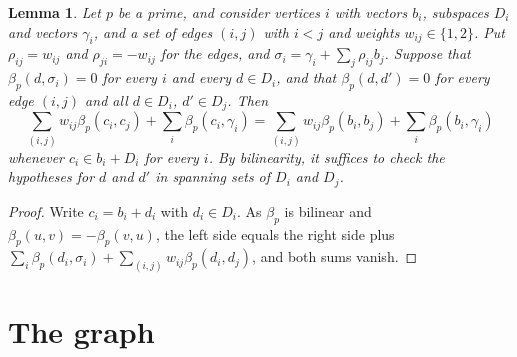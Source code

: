\documentclass[11pt]{article}
\newtheorem{lemma}[theorem]{Lemma}
\begin{document}
\begin{lemma}\label{lem:envelope}
Let $p$ be a prime, and consider vertices $i$ with vectors $b_i$, subspaces $D_i$ and vectors $\gamma_i$, and a set of edges $(i,j)$ with $i<j$ and weights $w_{ij}\in\{1,2\}$. Put $\rho_{ij}=w_{ij}$ and $\rho_{ji}=-w_{ij}$ for the edges, and $\sigma_i=\gamma_i+\sum_j\rho_{ij}b_j$. Suppose that $\beta_p(d,\sigma_i)=0$ for every $i$ and every $d\in D_i$, and that $\beta_p(d,d')=0$ for every edge $(i,j)$ and all $d\in D_i$, $d'\in D_j$. Then
\[
\sum_{(i,j)}w_{ij}\beta_p(c_i,c_j)+\sum_i\beta_p(c_i,\gamma_i)=\sum_{(i,j)}w_{ij}\beta_p(b_i,b_j)+\sum_i\beta_p(b_i,\gamma_i)
\]
whenever $c_i\in b_i+D_i$ for every $i$. By bilinearity, it suffices to check the hypotheses for $d$ and $d'$ in spanning sets of $D_i$ and $D_j$.
\end{lemma}

\begin{proof}
Write $c_i=b_i+d_i$ with $d_i\in D_i$. As $\beta_p$ is bilinear and $\beta_p(u,v)=-\beta_p(v,u)$, the left side equals the right side plus $\sum_i\beta_p(d_i,\sigma_i)+\sum_{(i,j)}w_{ij}\beta_p(d_i,d_j)$, and both sums vanish.
\end{proof}
\section{The graph}
\end{document}
